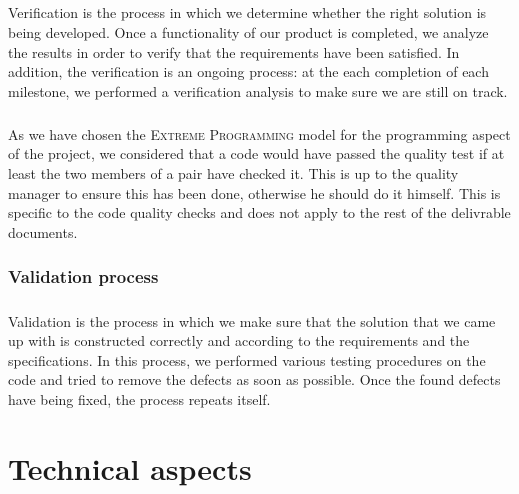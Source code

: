 \documentclass{report}
\begin{document}
\paragraph{}
\hspace{4mm}\textnormal{Verification is the process in which we determine
whether the right solution is being developed.
Once a functionality of our product is completed, 
we analyze the results in order to
 verify that the requirements have been satisfied. 
 In addition, the verification is an ongoing process:
 at the each completion of each milestone, 
we performed a verification analysis to make 
sure we are still on track.}

\paragraph{}
\hspace{4mm}\textnormal{As we have chosen the \textsc{Extreme Programming} model for the programming 
aspect of the project, we considered that a code would have passed
 the quality test if at least the two members of a pair have checked 
it. This is up to the quality manager to ensure this has been done, 
otherwise he should do it himself. This is specific to the code quality 
checks and does not apply to the rest of the delivrable documents.}

\subsection{Validation process}

\paragraph{}
\hspace{4mm}\textnormal{Validation is the process in which we make sure that the solution
that we came up with is 
constructed correctly and according to the requirements 
and the specifications.
In this process, we performed various testing procedures on
 the code and tried to remove the defects as soon as possible. 
Once the found defects have being fixed, the process repeats itself.}

\paragraph{}
\hspace{4mm}\textnormal{}

\chapter{Technical aspects}
\end{document}
